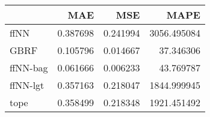 \begin{tabular}{lrrr}
\toprule
{} &       MAE &       MSE &         MAPE \\
\midrule
ffNN     &  0.387698 &  0.241994 &  3056.495084 \\
GBRF     &  0.105796 &  0.014667 &    37.346306 \\
ffNN-bag &  0.061666 &  0.006233 &    43.769787 \\
ffNN-lgt &  0.357163 &  0.218047 &  1844.999945 \\
tope     &  0.358499 &  0.218348 &  1921.451492 \\
\bottomrule
\end{tabular}
